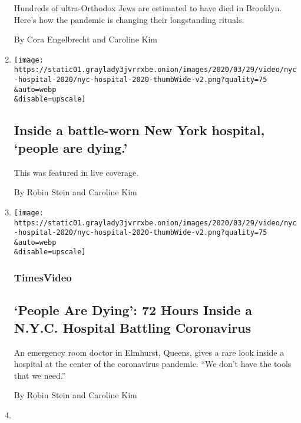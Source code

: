 \begin{enumerate}
  Hundreds of ultra-Orthodox Jews are estimated to have died in
  Brooklyn. Here's how the pandemic is changing their longstanding
  rituals.

  By Cora Engelbrecht and Caroline Kim
\item
  \href{/live/2020/coronavirus-usa-live-03-25/inside-a-battle-worn-new-york-hospital-people-are-dying}{}

  \texttt{[image: https://static01.graylady3jvrrxbe.onion/images/2020/03/29/video/nyc-hospital-2020/nyc-hospital-2020-thumbWide-v2.png?quality=75\\\&auto=webp\\\&disable=upscale]}

  \hypertarget{inside-a-battle-worn-new-york-hospital-people-are-dying}{%
  \subsection{Inside a battle-worn New York hospital, `people are
  dying.'}\label{inside-a-battle-worn-new-york-hospital-people-are-dying}}

  This was featured in live coverage.

  By Robin Stein and Caroline Kim
\item
  \href{/video/nyregion/100000007052136/coronavirus-elmhurst-hospital-queens.html}{}

  \texttt{[image: https://static01.graylady3jvrrxbe.onion/images/2020/03/29/video/nyc-hospital-2020/nyc-hospital-2020-thumbWide-v2.png?quality=75\\\&auto=webp\\\&disable=upscale]}

  \hypertarget{timesvideo-4}{%
  \subsubsection{TimesVideo}\label{timesvideo-4}}

  \hypertarget{people-are-dying-72-hours-inside-a-nyc-hospital-battling-coronavirus}{%
  \subsection{`People Are Dying': 72 Hours Inside a N.Y.C. Hospital
  Battling
  Coronavirus}\label{people-are-dying-72-hours-inside-a-nyc-hospital-battling-coronavirus}}

  An emergency room doctor in Elmhurst, Queens, gives a rare look inside
  a hospital at the center of the coronavirus pandemic. ``We don't have
  the tools that we need.''

  By Robin Stein and Caroline Kim
\item
  \href{/video/us/100000007032376/us-coronavirus-testing.html}{}


\end{enumerate}
